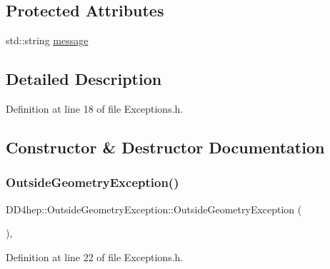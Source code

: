 \subsection*{Protected Attributes}
\begin{DoxyCompactItemize}
\item 
std\+::string \hyperlink{class_d_d4hep_1_1_outside_geometry_exception_aaa768606a23c1acf432ffe83a76f0991}{message}
\end{DoxyCompactItemize}


\subsection{Detailed Description}


Definition at line 18 of file Exceptions.\+h.



\subsection{Constructor \& Destructor Documentation}
\hypertarget{class_d_d4hep_1_1_outside_geometry_exception_afcb996b89fe54d62d9c20068cb342812}{}\label{class_d_d4hep_1_1_outside_geometry_exception_afcb996b89fe54d62d9c20068cb342812} 
\subsubsection{\texorpdfstring{Outside\+Geometry\+Exception()}{OutsideGeometryException()}\hspace{0.1cm}{\footnotesize\ttfamily [1/2]}}
{\footnotesize\ttfamily D\+D4hep\+::\+Outside\+Geometry\+Exception\+::\+Outside\+Geometry\+Exception (\begin{DoxyParamCaption}{ }\end{DoxyParamCaption})\hspace{0.3cm}{\ttfamily [inline]}, {\ttfamily [protected]}}



Definition at line 22 of file Exceptions.\+h.

\hypertarget{class_d_d4hep_1_1_outside_geometry_exception_a11e9856846c7f8f2acb85f2774558422}{}\label{class_d_d4hep_1_1_outside_geometry_exception_a11e9856846c7f8f2acb85f2774558422} 
